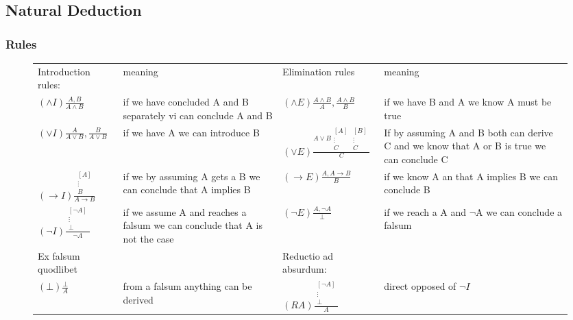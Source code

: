 \subsection{Natural Deduction}
	\subsubsection{Rules}


	{
\begin{figure}[H]
	\begin{tabular}{m{3cm} p{4cm} m{3cm} p{4cm}}
		
		Introduction rules: & meaning	& Elimination rules & meaning\\ 
		$ \left( \land I\right) \frac{A,B}{A\land B} $ & \normalsize if we have concluded A and B separately vi can conclude A and B	& $\left( \land E\right) \frac{A \land B}{A}, \frac{A \land B}{B} $ & \normalsize if we have B and A we know A must be true  \\[1cm]  
		\hline
		$ \left( \lor I\right) \frac{A}{A\lor B} , \frac{B}{A\lor B} $ & \normalsize if we have A we can introduce B & $(\lor E) \frac{A \lor B \begin{matrix}
			[A] & [B]  \\
			\vdots & \vdots  \\
			C & C
			\end{matrix}}{C} $ & \normalsize If by assuming A and B both can derive C and we know that A or B is true we can conclude C
		
		\\[1cm]
		\hline
		$(\to I) \frac{\begin{matrix}
			[A]  \\
			\vdots   \\
			B 
			\end{matrix}}{A\to B} $ & \normalsize if we by assuming A gets a B we can conclude that A implies B & $ (\to E) \frac{A,A\to B}{B} $ & if we know A an that A implies B we can conclude B \\[1cm] 
		\hline
		$ (\neg I) \frac{\begin{matrix}
			[\neg A]  \\
			\vdots   \\
			\bot 
			\end{matrix}}{\neg A} $ & \normalsize if we assume A and reaches a falsum we can conclude that A is not the case & $ (\neg E) \frac{A,\neg A}{\bot} $ & if we reach a A and $ \neg $A we can conclude a falsum\\[1cm]
		\hline
		Ex falsum quodlibet & & Reductio ad absurdum:\\ 
		$ (\bot ) \frac{\bot}{A} $ & from a falsum anything can be derived & $ (RA) \frac{\begin{matrix}
			[\neg A]  \\
			\vdots   \\
			\bot 
			\end{matrix}}{A} $ & direct opposed of $ \neg I $
	

\end{tabular}
\end{figure}}
